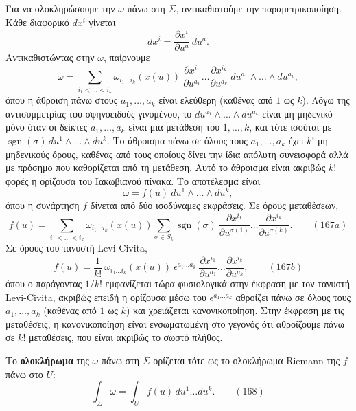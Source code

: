 \documentclass[12pt]{article}
\begin{document}
Για να ολοκληρώσουμε την $\omega$ πάνω στη $\Sigma$, αντικαθιστούμε την παραμετρικοποίηση. Κάθε διαφορικό $dx^i$ γίνεται
\[
dx^i = \frac{\partial x^i}{\partial u^a} \ du^a.
\]
Αντικαθιστώντας στην $\omega$, παίρνουμε
\[
\omega = \sum_{i_1 < \dots < i_k} \omega_{i_1 \dots i_k}(x(u)) \ \frac{\partial x^{i_1}}{\partial u^{a_1}} \dots \frac{\partial x^{i_k}}{\partial u^{a_k}} \ du^{a_1} \wedge \dots \wedge du^{a_k},
\]
όπου η άθροιση πάνω στους $a_1, \dots, a_k$ είναι ελεύθερη (καθένας από $1$ ως $k$). Λόγω της αντισυμμετρίας του σφηνοειδούς γινομένου, το $du^{a_1} \wedge \dots \wedge du^{a_k}$ είναι μη μηδενικό μόνο όταν οι δείκτες $a_1, \dots, a_k$ είναι μια μετάθεση του $1, \dots, k$, και τότε ισούται με $\operatorname{sgn}(\sigma) \, du^1 \wedge \dots \wedge du^k$. Το άθροισμα πάνω σε όλους τους $a_1, \dots, a_k$ έχει $k!$ μη μηδενικούς όρους, καθένας από τους οποίους δίνει την ίδια απόλυτη συνεισφορά αλλά με πρόσημο που καθορίζεται από τη μετάθεση. Αυτό το άθροισμα είναι ακριβώς $k!$ φορές η ορίζουσα του Ιακωβιανού πίνακα. Το αποτέλεσμα είναι
\[
\omega = f(u) \ du^1 \wedge \dots \wedge du^k,
\]
όπου η συνάρτηση $f$ δίνεται από δύο ισοδύναμες εκφράσεις. Σε όρους μεταθέσεων,
\begin{equation}
f(u) = \sum_{i_1 < \dots < i_k} \omega_{i_1 \dots i_k}(x(u)) \sum_{\sigma \in S_k} \operatorname{sgn}(\sigma) \ \frac{\partial x^{i_1}}{\partial u^{\sigma(1)}} \dots \frac{\partial x^{i_k}}{\partial u^{\sigma(k)}}. \qquad (167a)
\end{equation}
Σε όρους του τανυστή Levi-Civita,
\begin{equation}
f(u) = \frac{1}{k!} \ \omega_{i_1 \dots i_k}(x(u)) \ \epsilon^{a_1 \dots a_k} \ \frac{\partial x^{i_1}}{\partial u^{a_1}} \dots \frac{\partial x^{i_k}}{\partial u^{a_k}}, \qquad (167b)
\end{equation}
όπου ο παράγοντας $1/k!$ εμφανίζεται τώρα φυσιολογικά στην έκφραση με τον τανυστή Levi-Civita, ακριβώς επειδή η ορίζουσα μέσω του $\epsilon^{a_1 \dots a_k}$ αθροίζει πάνω σε όλους τους $a_1, \dots, a_k$ (καθένας από $1$ ως $k$) και χρειάζεται κανονικοποίηση. Στην έκφραση με τις μεταθέσεις, η κανονικοποίηση είναι ενσωματωμένη στο γεγονός ότι αθροίζουμε πάνω σε $k!$ μεταθέσεις, που είναι ακριβώς το σωστό πλήθος.

Το \textbf{ολοκλήρωμα} της $\omega$ πάνω στη $\Sigma$ ορίζεται τότε ως το ολοκλήρωμα Riemann της $f$ πάνω στο $U$:
\begin{equation}
\int_\Sigma \omega = \int_U f(u) \, du^1 \dots du^k. \qquad (168)
\end{equation}
\end{document}
